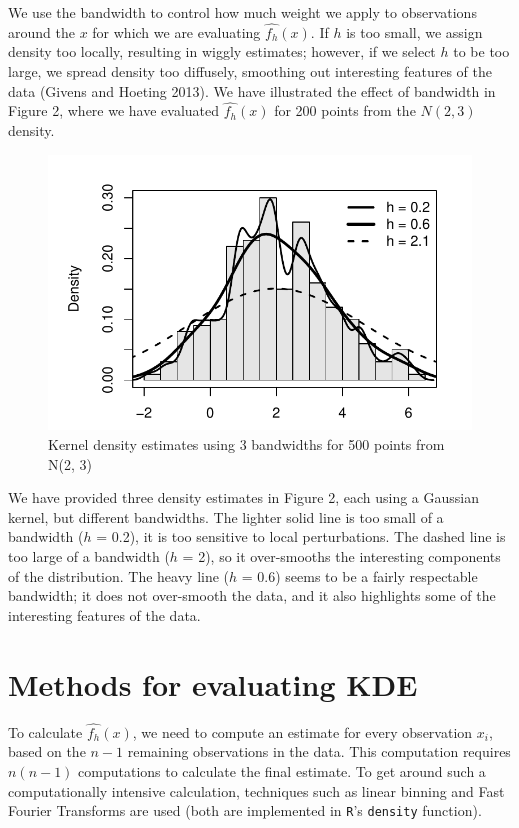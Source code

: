 \documentclass[]{article}
\begin{document}
We use the bandwidth to control how much weight we apply to observations
around the \(x\) for which we are evaluating \(\widehat{f_h}(x)\). If
\(h\) is too small, we assign density too locally, resulting in wiggly
estimates; however, if we select \(h\) to be too large, we spread
density too diffusely, smoothing out interesting features of the data
(Givens and Hoeting 2013). We have illustrated the effect of bandwidth
in Figure 2, where we have evaluated \(\widehat{f_h}(x)\) for 200 points
from the \(N(2, 3)\) density.

\begin{figure}[htbp]
\centering
\includegraphics{FinalReport_files/figure-latex/unnamed-chunk-3-1.pdf}
\caption{Kernel density estimates using 3 bandwidths for 500 points from
N(2, 3)}
\end{figure}

We have provided three density estimates in Figure 2, each using a
Gaussian kernel, but different bandwidths. The lighter solid line is too
small of a bandwidth (\(h\) = 0.2), it is too sensitive to local
perturbations. The dashed line is too large of a bandwidth (\(h\) = 2),
so it over-smooths the interesting components of the distribution. The
heavy line (\(h\) = 0.6) seems to be a fairly respectable bandwidth; it
does not over-smooth the data, and it also highlights some of the
interesting features of the data.

\newpage

\section{Methods for evaluating KDE}\label{methods-for-evaluating-kde}

To calculate \(\widehat{f_h}(x)\), we need to compute an estimate for
every observation \(x_i\), based on the \(n-1\) remaining observations
in the data. This computation requires \(n (n-1)\) computations to
calculate the final estimate. To get around such a computationally
intensive calculation, techniques such as linear binning and Fast
Fourier Transforms are used (both are implemented in \texttt{R}'s
\texttt{density} function).
\end{document}
